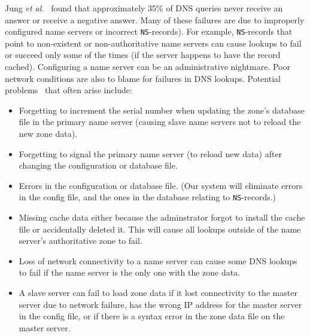 Jung {\it et al.}~\cite{dnscache:sigcommimw01} found that approximately
35\% of DNS queries never receive an answer or receive
a negative answer. Many of these failures are due to 
improperly configured name servers or incorrect {\tt NS}-records).
For example, {\tt NS}-records that point to non-existent 
or non-authoritative name servers can cause lookups to fail
or succeed only some of the times (if the server happens
to have the record cached). 
Configuring a name server can be an administrative nightmare.
Poor network conditions are also to blame for failures in DNS lookups.
Potential problems~\cite{dns-bind} that often arise include: 
\begin{itemize}
\item Forgetting to increment the serial number when updating the 
zone's database file in the primary name server (causing slave name 
servers not to reload the new zone data).
\item Forgetting to signal the primary name server 
(to reload new data) after 
changing the configuration or database file. 
\item Errors in the configuration or database file. 
(Our system will eliminate errors in the config file, 
and the ones in the database relating to {\tt NS}-records.) 
\item Missing cache data either because the adminstrator 
forgot to install the cache file or accidentally deleted it. 
This will cause all lookups outside 
of the name server's authoritative zone to fail. 
\item Loss of network connectivity to a name server 
can cause some DNS lookups to fail if the name server is
the only one with the zone data. 
\item A slave server can fail to load zone data 
if it lost connectivity to the master server due to 
network failure, has the wrong IP address for
the master server in the config file, or if there is 
a syntax error in the zone data file on the master server.
\end{itemize}


